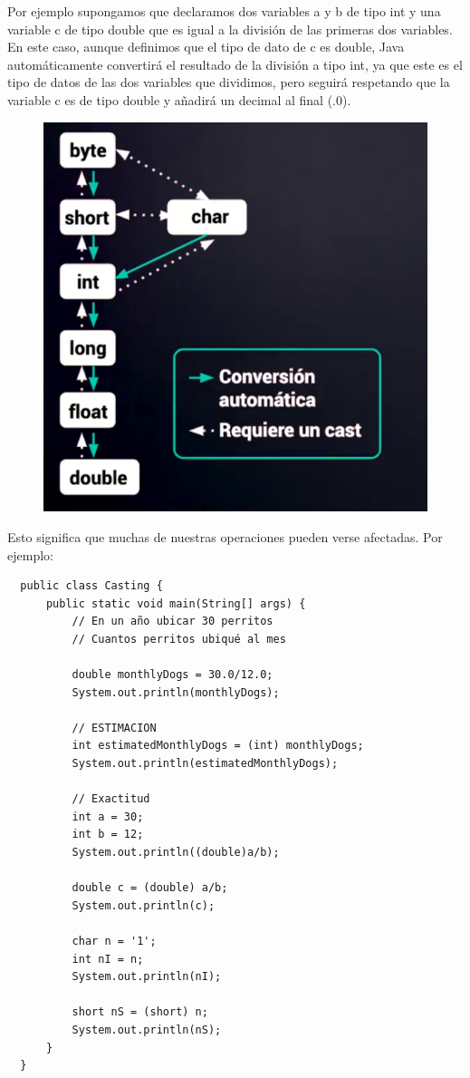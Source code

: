 \documentclass{article}
\begin{document}
Por ejemplo supongamos que declaramos dos variables a y b de tipo int y una
variable c de tipo double que es igual a la división de las primeras dos
variables.\\

En este caso, aunque definimos que el tipo de dato de c es double, Java
automáticamente convertirá el resultado de la división a tipo int, ya que este
es el tipo de datos de las dos variables que dividimos, pero seguirá respetando
que la variable c es de tipo double y añadirá un decimal al final (.0).

\begin{figure}[h!]
  \centering
  \includegraphics[scale=0.75]{./Pictures/003_conversiones.png}
\end{figure}


Esto significa que muchas de nuestras operaciones pueden verse afectadas. Por
ejemplo:

\begin{verbatim}
  public class Casting {
      public static void main(String[] args) {
          // En un año ubicar 30 perritos
          // Cuantos perritos ubiqué al mes

          double monthlyDogs = 30.0/12.0;
          System.out.println(monthlyDogs);

          // ESTIMACION
          int estimatedMonthlyDogs = (int) monthlyDogs;
          System.out.println(estimatedMonthlyDogs);

          // Exactitud
          int a = 30;
          int b = 12;
          System.out.println((double)a/b);

          double c = (double) a/b;
          System.out.println(c);

          char n = '1';
          int nI = n;
          System.out.println(nI);

          short nS = (short) n;
          System.out.println(nS);
      }
  }
\end{verbatim}
\end{document}
